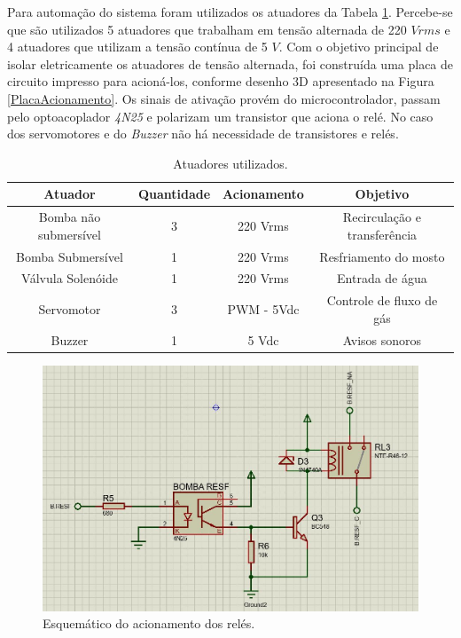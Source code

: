 Para automação do sistema foram utilizados os atuadores da Tabela \ref{Atuadores}. Percebe-se que são utilizados 5 atuadores que trabalham em tensão alternada de 220 $Vrms$ e 4 atuadores que utilizam a tensão contínua de 5 $V$. Com o objetivo principal de isolar eletricamente os atuadores de tensão alternada, foi construída uma placa de circuito impresso para acioná-los, conforme desenho 3D apresentado na Figura \ref{PlacaAcionamento}. Os sinais de ativação provém do microcontrolador, passam pelo optoacoplador \textit{4N25} e polarizam um transistor que aciona o relé. No caso dos servomotores e do \textit{Buzzer} não há necessidade de transistores e relés.




\begin{table}[]
\caption{Atuadores utilizados.}
\label{Atuadores}
\begin{tabular}{cccc}
\hline
\textbf{Atuador}      & \textbf{Quantidade} & \textbf{Acionamento} & \textbf{Objetivo}            \\ \hline
Bomba não submersível & 3                   & 220 Vrms             & Recirculação e transferência \\ \hline
Bomba Submersível     & 1                   & 220 Vrms             & Resfriamento do mosto        \\ \hline
Válvula Solenóide     & 1                   & 220 Vrms             & Entrada de água              \\ \hline
Servomotor            & 3                   & PWM - 5Vdc           & Controle de fluxo de gás     \\ \hline
Buzzer                & 1                   & 5 Vdc                & Avisos sonoros               \\ \hline
\end{tabular}
\end{table}




\begin{figure}[htb]
	\caption{\label{esquematicoAcionamentos}Esquemático do acionamento dos relés.}
	\begin{center}
	    \includegraphics[width=0.75\linewidth]{./img/esquematicoAcionamento01.jpg}
	\end{center}
\end{figure}

